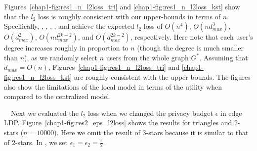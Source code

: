 
Figures~\ref{chap1-fig:res1_n_l2loss_tri} and \ref{chap1-fig:res1_n_l2loss_kst} show that the $l_2$ loss is roughly consistent with 
our upper-bounds in terms of $n$. 
Specifically, 
, 
,  , 
, and 
 achieve 
the expected $l_2$ loss of $O(n^4)$, $O(nd_{max}^3)$, $O(d_{max}^2)$, $O(nd_{max}^{2k-2})$, and $O(d_{max}^{2k-2})$, respectively. 
Here note that 
each user's degree increases roughly in proportion to $n$ (though the degree is much smaller than $n$), 
as we randomly select $n$ users from the whole graph $G^*$. Assuming that $d_{max} = O(n)$,  Figures~\ref{chap1-fig:res1_n_l2loss_tri} and \ref{chap1-fig:res1_n_l2loss_kst} are roughly consistent with the upper-bounds. 
The figures also show the limitations of the local model in terms of the utility when compared to the centralized model.


\smallskip
{}~~Next we evaluated the $l_2$ loss 
when we changed the privacy budget $\epsilon$ in edge LDP. 
Figure~\ref{chap1-fig:res2_eps_l2loss} shows the results for triangles and $2$-stars ($n=10000$). 
Here we omit the result of $3$-stars because it is similar to that of $2$-stars. 
In , we set $\epsilon_1 = \epsilon_2 = \frac{\epsilon}{2}$. 

